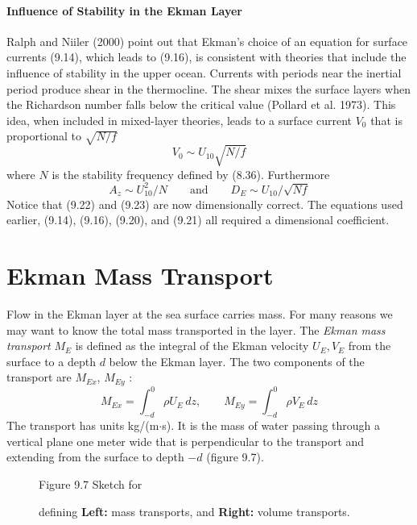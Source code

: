 \paragraph{Influence of Stability in the Ekman Layer}
Ralph and Niiler (2000)
point out that Ekman's choice of an equation for surface currents
(9.14), which leads to (9.16), is consistent with theories that
include the influence of stability in the upper ocean.  Currents with
periods near the inertial period produce shear
in the thermocline. The shear
mixes the surface layers when the Richardson number falls below the
critical value (Pollard et al. 1973). This idea, when included in
mixed-layer theories, leads to a surface current $V_0$ that is
proportional to $\sqrt{N/f}$
\begin{equation}
V_0 \sim U_{10}  \sqrt{N/f}
\end{equation}
where $N$ is the stability frequency defined by (8.36). Furthermore
\begin{equation}
A_z \sim U_{10}^2 / N \qquad \text{and} \qquad D_E \sim U_{10} / \sqrt{Nf}
\end{equation}
Notice that (9.22) and (9.23) are now dimensionally correct. The
equations used earlier, (9.14), (9.16), (9.20), and (9.21) all
required a dimensional coefficient.

\section{Ekman Mass Transport}
 Flow in the
Ekman layer at the sea surface carries mass. For many reasons we may
want to know the total mass transported in the layer. The
\textit{Ekman mass transport} $M_E$ is defined as the integral of the
Ekman velocity $U_E, V_E$ from the surface to a depth $d$ below the
Ekman layer. The two components of the transport are $M_{Ex}$,
$M_{Ey}$ :
\begin{equation}
M_{Ex} = \int^0_{-d} \rho U_E \, dz, \qquad
M_{Ey} = \int^0_{-d} \rho V_E \, dz
\end{equation}
The transport has units kg/(m$\cdot$s). It is the mass of water
passing through a vertical plane one meter wide that is perpendicular
to the transport and extending from the surface to depth $-d$ (figure 9.7).

\begin{figure}[h!]
\vspace{-2ex}
\centering
\footnotesize
Figure 9.7 Sketch for \rule{0mm}{3ex}defining \textbf{Left:} mass
transports, and \textbf{Right:} volume
transports.
\label{fig:transportsketch}
\end{figure}

